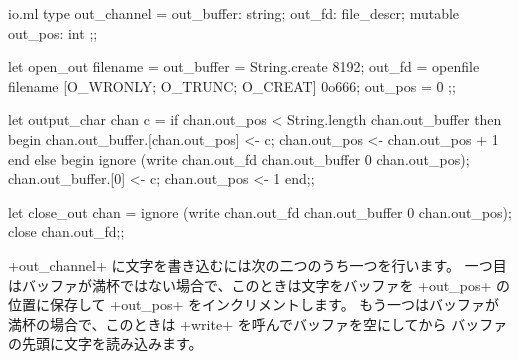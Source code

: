\begin{myimage}[width="85\%"]
\end{myimage}
%
\begin{listingcodefile}{io.ml}
type out_channel =
  { out_buffer: string;
    out_fd: file_descr;
    mutable out_pos: int };;

let open_out filename =
  { out_buffer = String.create 8192;
    out_fd = openfile filename [O_WRONLY; O_TRUNC; O_CREAT] 0o666;
    out_pos = 0 };;

let output_char chan c =
  if chan.out_pos < String.length chan.out_buffer then begin
    chan.out_buffer.[chan.out_pos] <- c;
    chan.out_pos <- chan.out_pos + 1
  end else begin
    ignore (write chan.out_fd chan.out_buffer 0 chan.out_pos);
    chan.out_buffer.[0] <- c;
    chan.out_pos <- 1
  end;;

let close_out chan =
  ignore (write chan.out_fd chan.out_buffer 0 chan.out_pos);
  close chan.out_fd;;
\end{listingcodefile}
%
\ml+out_channel+ に文字を書き込むには次の二つのうち一つを行います。
一つ目はバッファが満杯ではない場合で、このときは文字をバッファを \ml+out_pos+ の位置に保存して
\ml+out_pos+ をインクリメントします。
もう一つはバッファが満杯の場合で、このときは \ml+write+ を呼んでバッファを空にしてから
バッファの先頭に文字を読み込みます。

